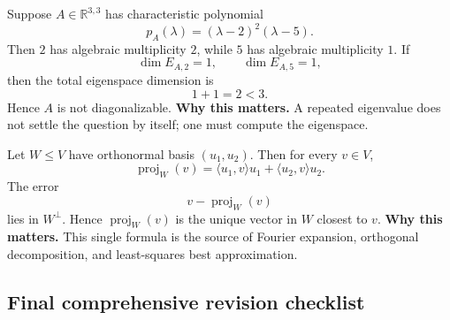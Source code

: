 \begin{examplebox}[title={Worked Illustration 3: diagonalizability with a repeated eigenvalue}]
Suppose \(A\in \mathbb{R}^{3,3}\) has characteristic polynomial
\[
p_A(\lambda)=(\lambda-2)^2(\lambda-5).
\]
Then \(2\) has algebraic multiplicity \(2\), while \(5\) has algebraic multiplicity \(1\). If
\[
\dim E_{A,2}=1,\qquad \dim E_{A,5}=1,
\]
then the total eigenspace dimension is
\[
1+1=2<3.
\]
Hence \(A\) is not diagonalizable.
\textbf{Why this matters.} A repeated eigenvalue does not settle the question by itself; one must compute the eigenspace.
\end{examplebox}

\begin{examplebox}[title={Worked Illustration 4: projection onto a subspace}]
Let \(W\le V\) have orthonormal basis \((u_1,u_2)\). Then for every \(v\in V\),
\[
\operatorname{proj}_W(v)=\langle u_1,v\rangle u_1+\langle u_2,v\rangle u_2.
\]
The error
\[
v-\operatorname{proj}_W(v)
\]
lies in \(W^\perp\). Hence \(\operatorname{proj}_W(v)\) is the unique vector in \(W\) closest to \(v\).
\textbf{Why this matters.} This single formula is the source of Fourier expansion, orthogonal decomposition, and least-squares best approximation.
\end{examplebox}

\subsection{Final comprehensive revision checklist}

